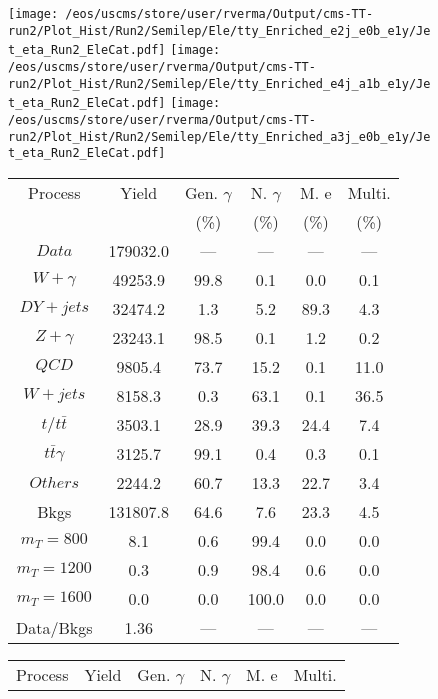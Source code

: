 \begin{figure}
\centering
\texttt{[image: /eos/uscms/store/user/rverma/Output/cms-TT-run2/Plot\_Hist/Run2/Semilep/Ele/tty\_Enriched\_e2j\_e0b\_e1y/Jet\_eta\_Run2\_EleCat.pdf]}
\texttt{[image: /eos/uscms/store/user/rverma/Output/cms-TT-run2/Plot\_Hist/Run2/Semilep/Ele/tty\_Enriched\_e4j\_a1b\_e1y/Jet\_eta\_Run2\_EleCat.pdf]}
\texttt{[image: /eos/uscms/store/user/rverma/Output/cms-TT-run2/Plot\_Hist/Run2/Semilep/Ele/tty\_Enriched\_a3j\_e0b\_e1y/Jet\_eta\_Run2\_EleCat.pdf]}
\begin{minipage}[c]{0.32\textwidth}
\centering
\tiny{
\begin{tabular}{cccccc}
\hline
Process & Yield & Gen. $\gamma$ & N. $\gamma$ & M. e & Multi. \\
 &  & (\%) & (\%) & (\%) & (\%)  \\
\hline
                                                                      $ Data $ &  179032.0 &  --- &  --- &  --- &  ---\\
$ W+\gamma $ &  49253.9 &  99.8 &  0.1 &  0.0 &  0.1\\
$ DY+jets $ &  32474.2 &  1.3 &  5.2 &  89.3 &  4.3\\
$ Z+\gamma $ &  23243.1 &  98.5 &  0.1 &  1.2 &  0.2\\
$ QCD $ &  9805.4 &  73.7 &  15.2 &  0.1 &  11.0\\
$ W+jets $ &  8158.3 &  0.3 &  63.1 &  0.1 &  36.5\\
$ t/t\bar{t} $ &  3503.1 &  28.9 &  39.3 &  24.4 &  7.4\\
$ t\bar{t}\gamma $ &  3125.7 &  99.1 &  0.4 &  0.3 &  0.1\\
$ Others $ &  2244.2 &  60.7 &  13.3 &  22.7 &  3.4\\
Bkgs &  131807.8 &  64.6 &  7.6 &  23.3 &  4.5\\
$ m_{T} = 800 $ &  8.1 &  0.6 &  99.4 &  0.0 &  0.0\\
$ m_{T} = 1200 $ &  0.3 &  0.9 &  98.4 &  0.6 &  0.0\\
$ m_{T} = 1600 $ &  0.0 &  0.0 &  100.0 &  0.0 &  0.0\\
Data/Bkgs &  1.36 &  --- &  --- &  --- &  ---\\
\hline
\end{tabular}
}
\end{minipage}
\begin{minipage}[c]{0.32\textwidth}
\centering
\tiny{
\begin{tabular}{cccccc}
\hline
Process & Yield & Gen. $\gamma$ & N. $\gamma$ & M. e & Multi. \\

\end{tabular}}
\end{minipage}
\end{figure}
